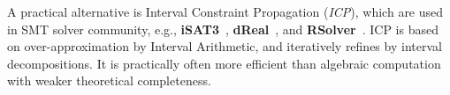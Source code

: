 \documentclass[runningheads,a4paper,oribibl]{llncs}
\begin{document}
A practical alternative is Interval Constraint Propagation ({\em ICP}), 
which are used in SMT solver community, e.g., {\bf iSAT3}~\cite{isat}, 
{\bf dReal}~\cite{dRealCADE13}, and \textbf{RSolver}~\cite{rsolver}. 
ICP is based on over-approximation by Interval Arithmetic, and iteratively refines by
interval decompositions. 
It is practically often more efficient than algebraic computation 
with weaker theoretical completeness. 

\end{document}
